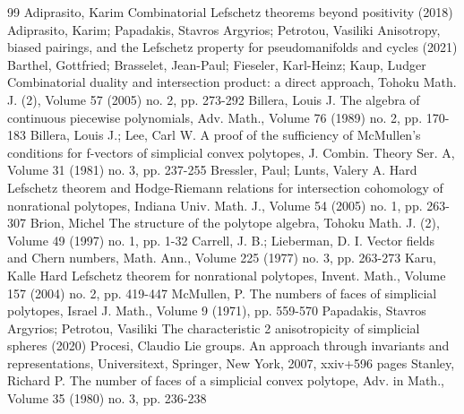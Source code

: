 \documentclass[10pt]{article}
\theoremstyle{definition}
\begin{document}
\begin{thebibliography}{99}
Adiprasito, Karim Combinatorial Lefschetz theorems beyond positivity (2018)
Adiprasito, Karim; Papadakis, Stavros Argyrios; Petrotou, Vasiliki Anisotropy, biased pairings, and the Lefschetz property for pseudomanifolds and cycles (2021)
Barthel, Gottfried; Brasselet, Jean-Paul; Fieseler, Karl-Heinz; Kaup, Ludger Combinatorial duality and intersection product: a direct approach, Tohoku Math. J. (2), Volume 57 (2005) no. 2, pp. 273-292
Billera, Louis J. The algebra of continuous piecewise polynomials, Adv. Math., Volume 76 (1989) no. 2, pp. 170-183
Billera, Louis J.; Lee, Carl W. A proof of the sufficiency of McMullen’s conditions for f-vectors of simplicial convex polytopes, J. Combin. Theory Ser. A, Volume 31 (1981) no. 3, pp. 237-255
Bressler, Paul; Lunts, Valery A. Hard Lefschetz theorem and Hodge-Riemann relations for intersection cohomology of nonrational polytopes, Indiana Univ. Math. J., Volume 54 (2005) no. 1, pp. 263-307
Brion, Michel The structure of the polytope algebra, Tohoku Math. J. (2), Volume 49 (1997) no. 1, pp. 1-32
Carrell, J. B.; Lieberman, D. I. Vector fields and Chern numbers, Math. Ann., Volume 225 (1977) no. 3, pp. 263-273
Karu, Kalle Hard Lefschetz theorem for nonrational polytopes, Invent. Math., Volume 157 (2004) no. 2, pp. 419-447
McMullen, P. The numbers of faces of simplicial polytopes, Israel J. Math., Volume 9 (1971), pp. 559-570
Papadakis, Stavros Argyrios; Petrotou, Vasiliki The characteristic 2 anisotropicity of simplicial spheres (2020)
Procesi, Claudio Lie groups. An approach through invariants and representations, Universitext, Springer, New York, 2007, xxiv+596 pages
Stanley, Richard P. The number of faces of a simplicial convex polytope, Adv. in Math., Volume 35 (1980) no. 3, pp. 236-238
\end{thebibliography}
\end{document}

